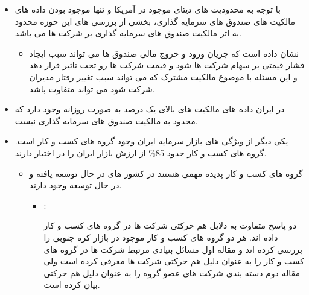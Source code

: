 \documentclass[12pt, a4paper]{article}
\begin{document}
\begin{itemize}
\item 
با توجه به محدودیت های دیتای موجود در آمریکا و  تنها موجود بودن داده های مالکیت های صندوق های سرمایه گذاری، بخشی از بررسی های این حوزه محدود به اثر مالکیت صندوق های سرمایه گذاری بر شرکت ها می باشد.
\begin{itemize}
\item 
{} 
نشان داده است که جریان ورود و خروج مالی صندوق ها می تواند سبب ایجاد فشار قیمتی بر سهام شرکت ها شود و قیمت شرکت ها رو تحت تاثیر قرار دهد و این مسئله با موصوع مالکیت مشترک که می تواند سبب تغییر رفتار مدیران شرکت شود می تواند متفاوت باشد.
\end{itemize}
\item 
در ایران داده های مالکیت های بالای یک درصد به صورت روزانه وجود دارد که محدود به مالکیت صندوق های سرمایه گذاری نیست.
\item 
 یکی دیگر از ویژگی های بازار سرمایه ایران وجود گروه های کسب و کار است. گروه های کسب و کار حدود 85\% از ارزش بازار ایران را در اختیار دارند.
 \begin{itemize}
 \item
  گروه های کسب و کار پدیده مهمی هستند در کشور های در حال توسعه یافته و در حال توسعه وجود دارند.
  \begin{itemize}
  \item {}:
  \begin{itemize}
دو پاسخ متفاوت به دلایل هم حرکتی شرکت ها در گروه های کسب و کار داده اند. هر دو گروه های کسب و کار موجود در بازار کره جنوبی را بررسی کرده اند و مقاله اول مسائل بنیادی مرتبط شرکت ها در گروه های کسب و کار را به عنوان دلیل هم جرکتی شرکت ها معرفی کرده است ولی مقاله دوم دسته بندی شرکت های عضو گروه را به عنوان دلیل هم حرکتی بیان کرده است. 
  \end{itemize}
  
  \end{itemize}
 \end{itemize}
\end{itemize}

\end{document}
